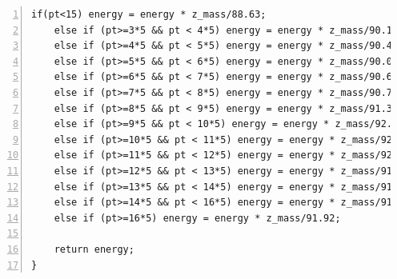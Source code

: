 \documentclass[11pt,a4paper,notitlepage]{scrartcl}
\begin{document}
\begin{lstlisting}[numbers=left, breaklines=true]
	if(pt<15) energy = energy * z_mass/88.63;
	else if (pt>=3*5 && pt < 4*5) energy = energy * z_mass/90.19;
	else if (pt>=4*5 && pt < 5*5) energy = energy * z_mass/90.47;
	else if (pt>=5*5 && pt < 6*5) energy = energy * z_mass/90.09;
	else if (pt>=6*5 && pt < 7*5) energy = energy * z_mass/90.62;
	else if (pt>=7*5 && pt < 8*5) energy = energy * z_mass/90.75;
	else if (pt>=8*5 && pt < 9*5) energy = energy * z_mass/91.32;
	else if (pt>=9*5 && pt < 10*5) energy = energy * z_mass/92.26;
	else if (pt>=10*5 && pt < 11*5) energy = energy * z_mass/92.14;
	else if (pt>=11*5 && pt < 12*5) energy = energy * z_mass/92.09;
	else if (pt>=12*5 && pt < 13*5) energy = energy * z_mass/91.96;
	else if (pt>=13*5 && pt < 14*5) energy = energy * z_mass/91.81;
	else if (pt>=14*5 && pt < 16*5) energy = energy * z_mass/91.85;
	else if (pt>=16*5) energy = energy * z_mass/91.92;
	
	return energy;
} 
\end{lstlisting}
\end{document}
